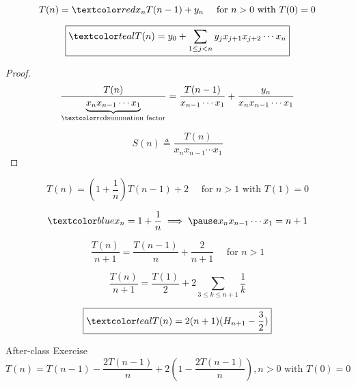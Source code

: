 \begin{frame}{}
  \begin{theorem}
    \[
      T(n) = \red{x_n} T(n-1) + y_n  \quad \text{ for } n > 0 \text{ with } T(0) = 0
    \]

    \[
      \boxed{\teal{T(n) = y_0 + \sum_{1 \le j < n} y_j x_{j+1} x_{j+2} \cdots x_n}}
    \]
  \end{theorem}

  \pause
  \begin{proof}
    \[
      \frac{T(n)}{\underbrace{x_n x_{n-1} \cdots x_1}_{\text{\red{summation factor}}}}
      	= \frac{T(n-1)}{x_{n-1} \cdots x_1} + \frac{y_n}{x_n x_{n-1} \cdots x_1}
    \]

    \pause
    \[
      S(n) \triangleq \frac{T(n)}{x_n x_{n-1} \cdots x_1}
    \]
  \end{proof}
\end{frame}

\begin{frame}{}
  \[
    T(n) = (1 + \frac{1}{n}) T(n-1) + 2  \quad \text{ for } n > 1 \text{ with } T(1) = 0
  \]

  \pause
  \[
    \blue{x_n = 1 + \frac{1}{n}} \implies \pause x_n x_{n-1} \cdots x_1 = n + 1
  \]

  \pause
  \[
    \frac{T(n)}{n+1} = \frac{T(n-1)}{n} + \frac{2}{n+1} \quad \text{ for } n > 1
  \]

  \pause
  \vspace{0.30cm}
  \[
    \frac{T(n)}{n+1} = \frac{T(1)}{2} + 2 \sum_{3 \le k \le n+1} \frac{1}{k}
  \]

  \pause
  \vspace{0.30cm}
  \[
    \boxed{\teal{T(n) = 2(n+1) (H_{n+1} - \frac{3}{2})}}
  \]
\end{frame}

\begin{frame}{}
  \begin{exampleblock}{After-class Exercise}
    \[
      T(n) = T(n-1) - \frac{2T(n-1)}{n} + 2\left(1 - \frac{2T(n-1)}{n}\right), n > 0 \text{ with } T(0) = 0
    \]
  \end{exampleblock}

  \pause
\end{frame}

